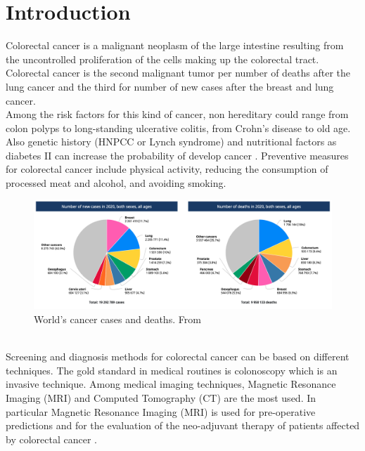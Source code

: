 \documentclass{standalone}
\begin{document}
\chapter*{Introduction}

Colorectal cancer is a malignant neoplasm of the large intestine resulting from the uncontrolled proliferation of the cells making up the colorectal tract.
Colorectal cancer is the second malignant tumor per number of deaths after the lung cancer and the third for number of new cases after the breast and lung cancer\cite{cancerstats}.\\
Among the risk factors for this kind of cancer, non hereditary could range from colon polyps to long-standing ulcerative colitis, from Crohn's disease to old age. 
Also genetic history (HNPCC or Lynch syndrome) and nutritional factors as diabetes II can increase the probability of develop cancer \cite{tesicoppola}.
Preventive measures for colorectal cancer include physical activity, reducing the consumption of processed meat and alcohol, and avoiding smoking\cite{stats2019}.
\begin{figure}[h!]
	\centering
	\includegraphics[width=\linewidth]{../images/cancerstats.png}
	\caption{World's cancer cases and deaths. From \cite{cancerstats} }
\end{figure}
\\
Screening and diagnosis methods for colorectal cancer can be based on different techniques. 
The gold standard in medical routines is colonoscopy which is an invasive technique\cite{jovana}.
Among medical imaging techniques, Magnetic Resonance Imaging (MRI) and Computed Tomography (CT) are the most used\cite{tesicoppola}. 
In particular Magnetic Resonance Imaging (MRI) is used for pre-operative predictions and for the evaluation of the neo-adjuvant therapy of patients affected by colorectal cancer \cite{tesicoppola}.
\end{document}
